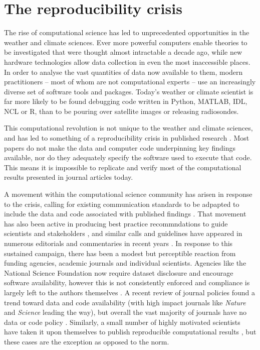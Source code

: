 \section{The reproducibility crisis}
The rise of computational science has led to unprecedented opportunities in the weather and climate sciences. Ever more powerful computers enable theories to be investigated that were thought almost intractable a decade ago, while new hardware technologies allow data collection in even the most inaccessible places. In order to analyse the vast quantities of data now available to them, modern practitioners – most of whom are not computational experts – use an increasingly diverse set of software tools and packages. Today's weather or climate scientist is far more likely to be found debugging code written in Python, MATLAB, IDL, NCL or R, than to be pouring over satellite images or releasing radiosondes. 

This computational revolution is not unique to the weather and climate sciences, and has led to something of a reproducibility crisis in published research \citep[e.g.][]{Peng2011}. Most papers do not make the data and computer code underpinning key findings available, nor do they adequately specify the software used to execute that code. This means it is impossible to replicate and verify most of the computational results presented in journal articles today.

A movement within the computational science community has arisen in response to the crisis, calling for existing communication standards to be adpapted to include the data and code associated with published findings \citep[e.g.][]{Stodden2014}. That movement has also been active in producing best practice recommndations to guide scientists and stakeholders \citep[e.g.][]{Sandve2013,Stodden2012a,Stodden2014}, and similar calls and guidelines have appeared in numerous editorials and commentaries in recent years \citep[e.g.][]{Barnes2010,Ince2012,Merali2010}. In response to this sustained campaign, there has been a modest but perceptible reaction from funding agencies, academic journals and individual scientists. Agencies like the National Science Foundation now require dataset disclosure and encourage software availability, however this is not consistently enforced and compliance is largely left to the authors themselves \citep{Stodden2013}. A recent review of journal policies found a trend toward data and code availability (with high impact journals like \textit{Nature} and \textit{Science} leading the way), but overall the vast majority of journals have no data or code policy \citep{Stodden2013}. Similarly, a small number of highly motivated scientists have taken it upon themselves to publish reproducible computational results \citep[e.g.][]{Crooks2014,Ketcheson2012,Schmitt2015}, but these cases are the exception as opposed to the norm.

